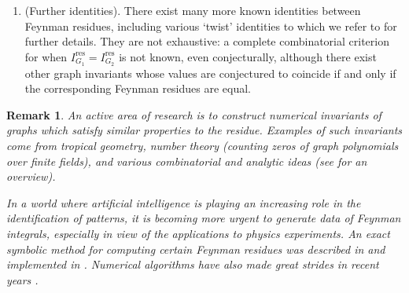 \documentclass[12pt]{amsart}
\newcommand{\res}{\mathrm{res}}
\theoremstyle{plain}
\newtheorem{remark}[thm]{Remark}
\newcommand{\0}{\color{blue}{\mathsf{0}}}
\begin{document}
\begin{enumerate}
Then one may prove that the residue $I^{\res}_G$ only depends on $\widehat{G}$. In other words,  if two distinct graphs $G_1,G_2$ have isomorphic completions $\widehat{G}_1 \cong \widehat{G}_2$ then 
\[ I^{\res}_{G_1} = I^{\res}_{G_2}\ . \]
Concretely, this means that, given the completion $\widehat{G}$ of a graph as above, one may remove any vertex from it, giving rise to possibly non-isomorphic graphs whose residues are equal. 
This property of completion invariance is very far from obvious from definition \eqref{Iresdef}: indeed, the graph polynomials $\Psi_G$ of two graphs with isomorphic completions may bear little resemblance. See \cite{Schnetz} for examples. 

\item (Further identities). There exist many more known identities between Feynman residues, including various `twist' identities  to which we refer to \cite{Schnetz} for further details. They are not exhaustive: a complete combinatorial criterion for when $I^{\res}_{G_1} = I^{\res}_{G_2}$ is not known, even conjecturally, although there exist other graph invariants whose values are conjectured to coincide if and only if the corresponding Feynman residues are equal.


\end{enumerate} 

\begin{remark}
An active area of research is to construct numerical invariants of graphs which satisfy similar properties to the residue.  Examples of such invariants come from tropical geometry, number theory (counting zeros of graph polynomials over finite fields), and various combinatorial and analytic ideas (see \cite{HeppBounds} for an overview). 

In a world where artificial intelligence is playing an increasing role in the identification of patterns, it is becoming more urgent to generate data of Feynman integrals, especially in view of the applications to physics experiments.  An exact symbolic method for computing certain Feynman residues was described in \cite{BrMassless} and implemented in \cite{Panzer}. Numerical algorithms have also made great strides in recent years \cite{BorinskyTMCQ, Balduf2023}.

\end{remark}
\end{document}
